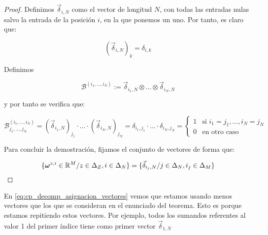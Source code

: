 \begin{proof}
    Definimos $\vec{\delta}_{i, N}$ como el vector de longitud $N$, con todas las entradas nulas salvo la entrada de la posición $i$, en la que ponemos un uno. Por tanto, es claro que:

    \begin{equation}
        (\vec{\delta}_{i, N})_k =  \delta_{i, k}
    \end{equation}

    Definimos

    \begin{equation}
        \mathcal{B}^{(i_1, \ldots, i_N)} := \vec{\delta}_{i_1, N} \otimes \ldots \otimes \vec{\delta}_{i_N, N}
    \end{equation}

    y por tanto se verifica que:

    \begin{equation}
        \mathcal{B}^{(i_1, \ldots, i_N)}_{j_1, \ldots, j_N} = (\vec{\delta}_{i_1, N})_{j_1} \cdot \ldots \cdot (\vec{\delta}_{i_N, N})_{j_N} = \delta_{i_1, j_1} \cdot \ldots \cdot \delta_{i_N, j_N} =
        \begin{cases}
            1 & \text{si } i_1 = j_1, \ldots, i_N = j_N \\
            0 & \text{en otro caso}
        \end{cases}
    \end{equation}

    Para concluir la demostración, fijamos el conjunto de vectores de forma que:

    \begin{equation} \label{eq:cp_decomp_asignacion_vectores}
        \{\boldsymbol{\omega}^{z, i} \in \mathbb{R}^M / z \in \Delta_{Z}, i \in \Delta_{N} \} =
        \{ \vec{\delta}_{i_j, N} / j \in \Delta_{N}, i_j \in \Delta_{M} \}
    \end{equation}

\end{proof}

\begin{observacion}

    En \eqref{eq:cp_decomp_asignacion_vectores} vemos que estamos usando menos vectores que los que se consideran en el enunciado del teorema. Esto es porque estamos repitiendo estos vectores. Por ejemplo, todos los sumandos referentes al valor 1 del primer índice tiene como primer vector $\vec{\delta}_{1, N}$

\end{observacion}







\endinput
